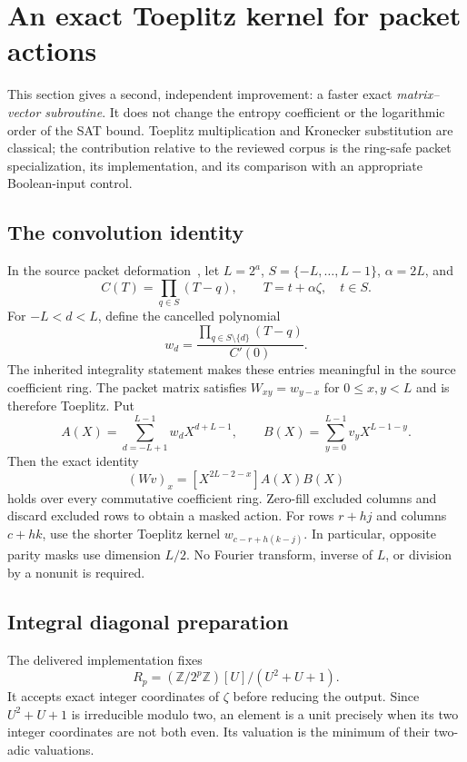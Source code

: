 \section{An exact Toeplitz kernel for packet actions}
\label{sec:kernel}

This section gives a second, independent improvement: a faster exact
\emph{matrix--vector subroutine}. It does not change the entropy coefficient
or the logarithmic order of the SAT bound. Toeplitz multiplication and
Kronecker substitution are classical; the contribution relative to the
reviewed corpus is the ring-safe packet specialization, its implementation,
and its comparison with an appropriate Boolean-input control.

\subsection{The convolution identity}
In the source packet deformation~\cite{openai}, let $L=2^a$,
$S=\{-L,\ldots,L-1\}$, $\alpha=2L$, and
\[
 C(T)=\prod_{q\in S}(T-q),\qquad T=t+\alpha\zeta,\quad t\in S.
\]
For $-L<d<L$, define the cancelled polynomial
\[
 w_d=\frac{\prod_{q\in S\setminus\{d\}}(T-q)}{C'(0)}.
\]
The inherited integrality statement makes these entries meaningful in the
source coefficient ring. The packet matrix satisfies
$W_{xy}=w_{y-x}$ for $0\le x,y<L$ and is therefore Toeplitz. Put
\[
 A(X)=\sum_{d=-L+1}^{L-1}w_dX^{d+L-1},\qquad
 B(X)=\sum_{y=0}^{L-1}v_yX^{L-1-y}.
\]
Then the exact identity
\begin{equation}
 (Wv)_x=[X^{2L-2-x}]A(X)B(X)\label{eq:toeplitz}
\end{equation}
holds over every commutative coefficient ring. Zero-fill excluded columns
and discard excluded rows to obtain a masked action. For rows $r+hj$ and
columns $c+hk$, use the shorter Toeplitz kernel
$w_{c-r+h(k-j)}$. In particular, opposite parity masks use dimension $L/2$.
No Fourier transform, inverse of $L$, or division by a nonunit is required.

\subsection{Integral diagonal preparation}
The delivered implementation fixes
\[
 R_p=(\mathbb Z/2^p\mathbb Z)[U]/(U^2+U+1).
\]
It accepts exact integer coordinates of $\zeta$ before reducing the output.
Since $U^2+U+1$ is irreducible modulo two, an element is a unit precisely
when its two integer coordinates are not both even. Its valuation is the
minimum of their two-adic valuations.

